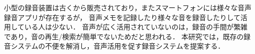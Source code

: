 \begin{jabstract}
小型の録音装置は古くから販売されており，またスマートフォンには様々な音声録音アプリが存在するが，
音声メモを記録したり様々な音を録音したりして活用している人は少ない．
音声が広く活用されていないのは，録音の手間が繁雑であり，音の再生/検索が簡単でないためだと思われる．
本研究では，既存の録音システムの不便を解消し，音声活用を促す録音システムを提案する．
\end{jabstract}